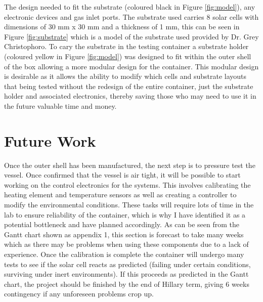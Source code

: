 \documentclass[a4paper,11pt]{article}
\begin{document}
\noindent The design needed to fit the substrate (coloured black in Figure \ref{fig:model}), any electronic devices and gas inlet ports. The substrate used carries 8 solar cells with dimensions of 30 mm x 30 mm and a thickness of 1 mm, this can be seen in Figure \ref{fig:substrate} which is a model of the substrate used provided by Dr. Grey Christophoro. To cary the substrate in the testing container a substrate holder (coloured yellow in Figure \ref{fig:model}) was designed to fit within the outer shell of the box allowing a more modular design for the container. This modular design is desirable as it allows the ability to modify which cells and substrate layouts that being tested without the redesign of the entire container, just the substrate holder and associated electronics, thereby saving those who may need to use it in the future valuable time and money. 
\section{Future Work}
Once the outer shell has been manufactured, the next step is to pressure test the vessel. Once confirmed that the vessel is air tight, it will be possible to start working on the control electronics for the systems. This involves calibrating the heating element and temperature sensors as well as creating a controller to modify the environmental conditions. These tasks will require lots of time in the lab to ensure reliability of the container, which is why I have identified it as a potential bottleneck and have planned accordingly. As can be seen from the Gantt chart shown as appendix 1, this section is forecast to take many weeks which as there may be problems when using these components due to a lack of experience. Once the calibration is complete the container will undergo many tests to see if the solar cell reacts as predicted (failing under certain conditions, surviving under inert environments). If this proceeds as predicted in the Gantt chart, the project should be finished by the end of Hillary term, giving 6 weeks contingency if any unforeseen problems crop up. 
\begin{singlespace}


\end{singlespace}
\end{document}
